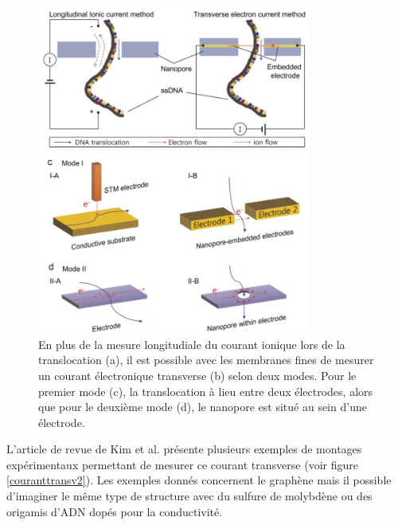 \begin{figure}[H]
\begin{center}
\includegraphics[width=0.8\textwidth]{introcouranttransverse.jpg}

\caption[Courants ioniques et transverses]{En plus de la mesure longitudiale du courant ionique lors de la translocation (a), il est possible avec les membranes fines de mesurer un courant électronique transverse (b) selon deux modes. Pour le premier mode (c), la translocation à lieu entre deux électrodes, alors que pour le deuxième mode (d), le nanopore est situé au sein d'une électrode.}
\label{couranttransv1}
\end{center}
\end{figure}

L'article de revue de Kim et al.\cite{Kim2015} présente plusieurs exemples de montages expérimentaux permettant de mesurer ce courant transverse (voir figure \ref{couranttransv2}). Les exemples donnés concernent le graphène mais il possible d'imaginer le même type de structure avec du sulfure de molybdène ou des origamis d'ADN dopés pour la conductivité.



